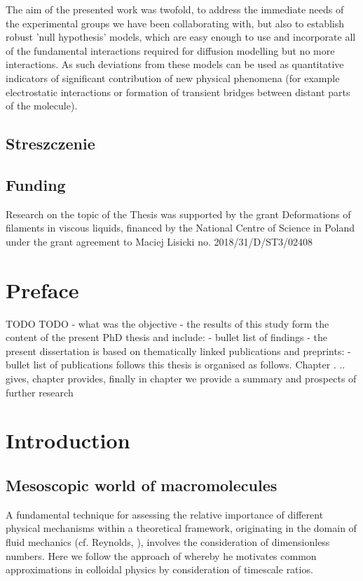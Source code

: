 \documentclass{doctoral}
\begin{document}
The aim of the presented work was twofold, to address the immediate needs of the experimental groups we have been collaborating with, but also to establish robust 'null hypothesis' models, which are easy enough to use and incorporate all of the fundamental interactions required for diffusion modelling but no more interactions.
As such deviations from these models can be used as quantitative indicators of significant contribution of new physical phenomena (for example electrostatic interactions or formation of transient bridges between distant parts of the molecule).
\clearpage

\section*{Streszczenie}

\clearpage

\section*{Funding}
Research on the topic of the Thesis was supported by the grant Deformations of filaments in viscous liquids, financed by the National Centre of Science in Poland under the grant agreement to Maciej Lisicki no.
2018/31/D/ST3/02408
\clearpage

\tableofcontents

\chapter*{Preface}

TODO TODO - what was the objective - the results of this study form the content of the present PhD thesis and include: - bullet list of findings - the present dissertation is based on thematically linked publications and preprints: - bullet list of publications follows this thesis is organised as follows.
Chapter .
.. gives, chapter provides, finally in chapter we provide a summary and prospects of further research

\chapter{Introduction}

\section{Mesoscopic world of macromolecules}

A fundamental technique for assessing the relative importance of different physical mechanisms within a theoretical framework, originating in the domain of fluid mechanics (cf.
Reynolds, \cite{Reynolds_1883}), involves the consideration of dimensionless numbers.
Here we follow the approach of \cite{Nagele_2013} whereby he motivates common approximations in colloidal physics by consideration of timescale ratios.
\end{document}
